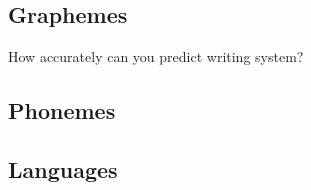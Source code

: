 \subsection{Graphemes}
How accurately can you predict writing system?

\subsection{Phonemes}

\subsection{Languages}

